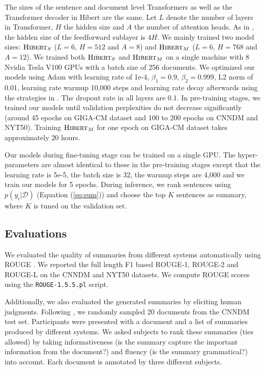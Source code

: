 \documentclass[11pt,a4paper]{article}
\begin{document}
The sizes of the sentence and document level Transformers as well as the Transformer decoder in {\sc Hibert} are the same. Let $L$ denote the number of layers in Transformer, $H$ the hidden size and $A$ the number of attention heads. As in \cite{vaswani:2017:nips,devlin:2018:arxiv}, the hidden size of the feedforward sublayer is $4H$. We mainly trained two model sizes: $\text{\sc Hibert}_S$ ($L=6$, $H=512$ and $A=8$) and $\text{\sc Hibert}_M$ ($L=6$, $H=768$ and $A=12$). We trained both $\text{\sc Hibert}_S$ and $\text{\sc Hibert}_M$ on a single machine with 8 Nvidia Tesla V100 GPUs with a batch size of 256 documents. We optimized our models using Adam with learning rate of 1e-4, $\beta_1=0.9$, $\beta_2=0.999$, L2 norm of 0.01, learning rate warmup 10,000 steps and learning rate decay afterwards using the strategies in . The dropout rate in all layers are 0.1. In pre-training stages, we trained our models until validation perplexities do not decrease significantly (around 45 epochs on GIGA-CM dataset and 100 to 200 epochs on CNNDM and NYT50). Training $\text{\sc Hibert}_M$ for one epoch on GIGA-CM dataset takes approximately 20 hours. 

Our models during fine-tuning stage can be trained on a single GPU. The hyper-parameters are almost identical to these in the pre-training stages except that the learning rate is 5e-5, the batch size is 32, the warmup steps are 4,000 and we train our models for 5 epochs. During inference, we rank sentences using 
$p( y_i | \mathcal{D} ) $ (Equation (\ref{eq:sum})) and choose the top $K$ sentences as summary, where $K$ is tuned on the validation set.

\subsection{Evaluations}
We evaluated the quality of summaries from different systems automatically using ROUGE \cite{lin:2004:acl:w}. We reported the full length F1 based ROUGE-1, ROUGE-2 and ROUGE-L on the \mbox{CNNDM} and NYT50 datasets. 
We compute ROUGE scores using the {\tt ROUGE-1.5.5.pl} script.

Additionally, we also evaluated the generated summaries by eliciting human judgments. Following \cite{cheng:2016:acl,Narayan:ea:2018}, we randomly sampled 20 documents from the CNNDM test set. Participants were presented with a document and a list of summaries produced by different systems. We asked subjects to rank these summaries (ties allowed) by taking {informativeness} (is the summary capture the important information from the document?) and \mbox{fluency} (is the summary grammatical?) into account. Each document is annotated by three different subjects. 
\end{document}
